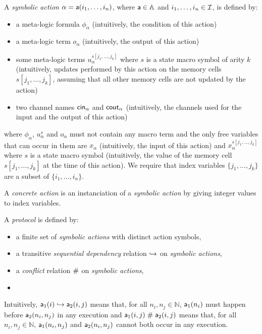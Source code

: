 \begin{definition}
  \label{def:action}
A \emph{symbolic action} $\alpha = \textsf{a}(i_1,\dots,i_n)$, where $\textsf{a} \in \mathbb{A}$ and $i_1,\dots,i_n \in \mathcal{I}$, is defined by:
\begin{itemize}
  \item a meta-logic formula $\phi_{\alpha}$ (intuitively, the condition of this action)
  \item a meta-logic term $o_{\alpha}$ (intuitively, the output of this action)
  \item some meta-logic terms $u_{\alpha}^{s[j_1,\ldots,j_k]}$ where $s$ is a
  state macro symbol of arity $k$ (intuitively, updates performed by this action
  on the memory cells $s[j_1,\ldots,j_k]$, assuming that all other memory cells
  are not updated by the action)
  \item two channel names $\mathsf{cin}_\alpha$ and $\mathsf{cout}_\alpha$ (intuitively, the channels used for the input and the output of this action)
\end{itemize}
where $\phi_{\alpha}$, $u_{\alpha}^{s}$ and $o_{\alpha}$ must not contain any
macro term and the only free variables that can occur in them are
$x_\alpha$ (intuitively, the input of this action)
and $x^{s[j_1,\ldots,j_k]}_\alpha$ where $s$ is a state macro symbol
(intuitively, the value
of the memory cell $s[j_1,\ldots,j_k]$ at the time of this action).
We require that index variables $\{j_1,\ldots,j_k\}$ are a subset of $\{i_1,\dots,i_n\}$.

\end{definition}

\begin{definition}
A \emph{concrete action} is an instanciation of a \emph{symbolic action} by giving integer values to index variables.
\end{definition}

\begin{definition}
  \label{def:proto}
  A \emph{protocol} is defined by:
  \begin{itemize}
    \item a finite set of \emph{symbolic actions} with distinct action symbols,
    \item a transitive \emph{sequential dependency} relation $\hookrightarrow$ on \emph{symbolic actions},
    \item a \emph{conflict} relation $\mathrel{\#}$ on \emph{symbolic actions},
    \item {}
  \end{itemize}
  Intuitively, $\textsf{a}_1(i)\hookrightarrow\textsf{a}_2(i,j)$ means that, for all $n_i,n_j \in \mathbb{N}$, $\textsf{a}_1(n_i)$ must happen before $\textsf{a}_2(n_i,n_j)$ in any execution
  and $\textsf{a}_1(i,j)\mathrel{\#}\textsf{a}_2(i,j)$ means that, for all $n_i,n_j \in \mathbb{N}$, $\textsf{a}_1(n_i,n_j)$ and $\textsf{a}_2(n_i,n_j)$ cannot both occur in any execution.
\end{definition}

